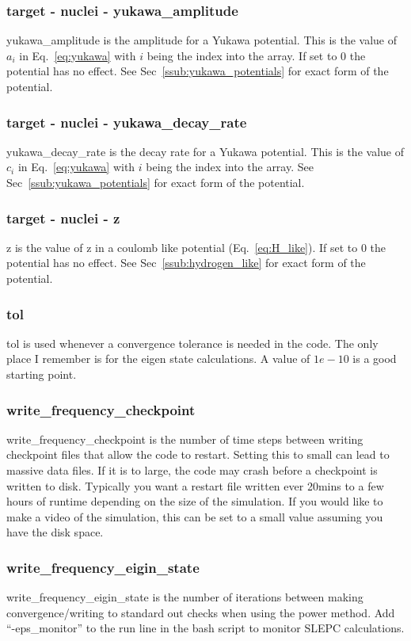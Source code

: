 \documentclass{article}
\begin{document}
\subsubsection{target - nuclei - yukawa\_amplitude}
yukawa\_amplitude is the amplitude for a Yukawa potential. This is the value of $a_i$ in Eq.~\ref{eq:yukawa} with $i$ being the index into the array. If set to 0 the potential has no effect. See Sec~\ref{ssub:yukawa_potentials} for exact form of the potential.

\subsubsection{target - nuclei - yukawa\_decay\_rate}
yukawa\_decay\_rate is the decay rate for a Yukawa potential. This is the value of $c_i$ in Eq.~\ref{eq:yukawa} with $i$ being the index into the array. See Sec~\ref{ssub:yukawa_potentials} for exact form of the potential.

\subsubsection{target - nuclei - z}
z is the value of z in a coulomb like potential (Eq.~\ref{eq:H_like}). If set to 0 the potential has no effect. See Sec~\ref{ssub:hydrogen_like} for exact form of the potential.

\subsubsection{tol}
tol is used whenever a convergence tolerance is needed in the code. The only place I remember is for the eigen state calculations. A value of $1e-10$ is a good starting point.

\subsubsection{write\_frequency\_checkpoint}
write\_frequency\_checkpoint is the number of time steps between writing checkpoint files that allow the code to restart. Setting this to small can lead to massive data files. If it is to large, the code may crash before a checkpoint is written to disk. Typically you want a restart file written ever 20mins to a few hours of runtime depending on the size of the simulation. If you would like to make a video of the simulation, this can be set to a small value assuming you have the disk space.

\subsubsection{write\_frequency\_eigin\_state}
write\_frequency\_eigin\_state is the number of iterations between making convergence/writing to standard out checks when using the power method. Add ``-eps\_monitor'' to the run line in the bash script to monitor SLEPC calculations.
\end{document}
